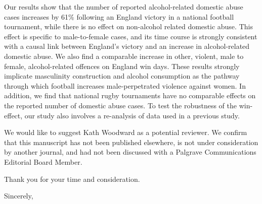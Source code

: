 \documentclass{letter}
\begin{document}
\begin{letter}
Our results show that the number of reported alcohol-related domestic abuse cases increases by 61\% following an England victory
in a national football tournament, while there is no effect on non-alcohol related domestic abuse. This effect is specific to male-to-female cases, and its time course is strongly consistent with a causal link between England's victory and an increase in alcohol-related domestic abuse. We also find a comparable increase in other, violent, male to female, alcohol-related offences on England win days. These results strongly implicate masculinity construction and alcohol consumption as the pathway through which football increases male-perpetrated violence against women. In addition, we find that national rugby tournaments have no comparable effects on the reported number of domestic abuse cases. To test the robustness of the win-effect, our study also involves a re-analysis of data used in a previous study. 

We would like to suggest Kath Woodward as a potential reviewer. We confirm that this manuscript has not been published elsewhere, is not under consideration by another journal, and had not been discussed with a Palgrave Communications Editorial Board Member.

Thank you for your time and consideration.

\closing{Sincerely,}



\end{letter}
\end{document}
